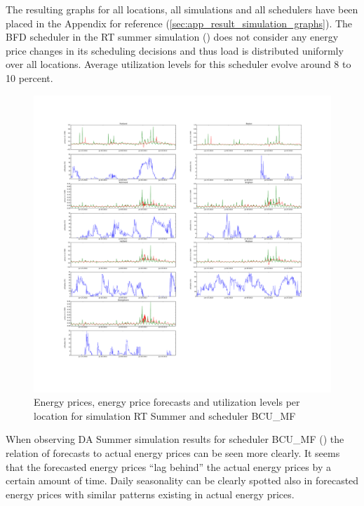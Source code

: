 The resulting graphs for all locations, all simulations and all schedulers have been placed in the Appendix for reference (\ref{sec:app_result_simulation_graphs}). The BFD scheduler in the RT summer simulation () does not consider any energy price changes in its scheduling decisions and thus load is distributed uniformly over all locations. Average utilization levels for this scheduler evolve around 8 to 10 percent. 

\begin{figure}[htbp]
	\centering
	\vspace*{-0.6in}
	\hspace*{-1.4in}
		\includegraphics[width=1.60\textwidth]{figures/evaluation_and_results/RT_Summer_scenario_6.pdf}
	\vspace*{-1.0in}
	\caption{Energy prices, energy price forecasts and utilization levels per location for simulation RT Summer and scheduler BCU\_MF}
	\label{fig:RT_Summer_scenario_6}
\end{figure}

When observing DA Summer simulation results for scheduler BCU\_MF () the relation of forecasts to actual energy prices can be seen more clearly. It seems that the forecasted energy prices ``lag behind'' the actual energy prices by a certain amount of time. Daily seasonality can be clearly spotted also in forecasted energy prices with similar patterns existing in actual energy prices. 

